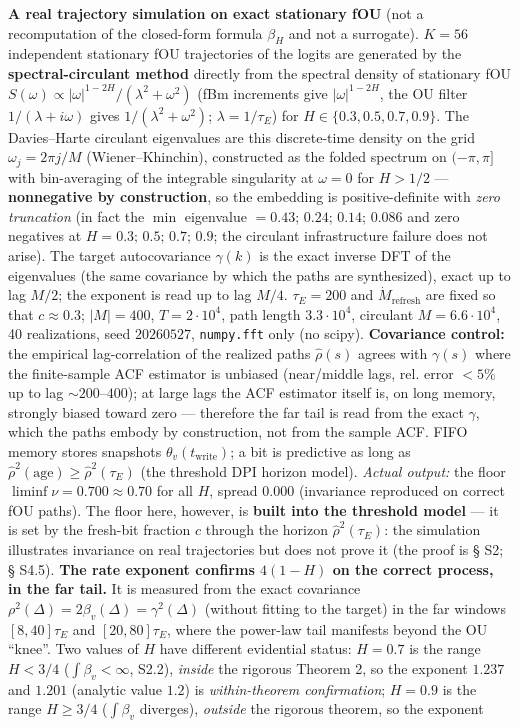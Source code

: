\documentclass[12pt]{iopart}
\begin{document}
\textbf{A real trajectory simulation on exact stationary fOU} (not a recomputation of the closed-form formula \(\beta_H\) and not a surrogate). \(K = 56\) independent stationary fOU trajectories of the logits are generated by the \textbf{spectral-circulant method} directly from the spectral density of stationary fOU \(S(\omega) \propto |\omega|^{1-2H}/(\lambda^2+\omega^2)\) (fBm increments give \(|\omega|^{1-2H}\), the OU filter \(1/(\lambda+i\omega)\) gives \(1/(\lambda^2+\omega^2)\); \(\lambda = 1/\tau_E\)) for \(H \in \{0.3, 0.5, 0.7, 0.9\}\). The Davies--Harte circulant eigenvalues are this discrete-time density on the grid \(\omega_j = 2\pi j/M\) (Wiener--Khinchin), constructed as the folded spectrum on \((-\pi,\pi]\) with bin-averaging of the integrable singularity at \(\omega = 0\) for \(H > 1/2\) --- \textbf{nonnegative by construction}, so the embedding is positive-definite with \emph{zero truncation} (in fact the \(\min\) eigenvalue \(= 0.43;\,0.24;\,0.14;\,0.086\) and zero negatives at \(H = 0.3;\,0.5;\,0.7;\,0.9\); the circulant infrastructure failure does not arise). The target autocovariance \(\gamma(k)\) is the exact inverse DFT of the eigenvalues (the same covariance by which the paths are synthesized), exact up to lag \(M/2\); the exponent is read up to lag \(M/4\). \(\tau_E = 200\) and \(\dot M_{\text{refresh}}\) are fixed so that \(c \approx 0.3\); \(|M| = 400\), \(T = 2\cdot10^4\), path length \(3.3\cdot10^4\), circulant \(M = 6.6\cdot10^4\), 40 realizations, seed \(20260527\), \texttt{numpy.fft} only (no scipy). \textbf{Covariance control:} the empirical lag-correlation of the realized paths \(\hat\rho(s)\) agrees with \(\gamma(s)\) where the finite-sample ACF estimator is unbiased (near/middle lags, rel. error \(<5\%\) up to lag \(\sim200\text{–}400\)); at large lags the ACF estimator itself is, on long memory, strongly biased toward zero --- therefore the far tail is read from the exact \(\gamma\), which the paths embody by construction, not from the sample ACF. FIFO memory stores snapshots \(\theta_v(t_{\text{write}})\); a bit is predictive as long as \(\hat\rho^2(\text{age}) \ge \hat\rho^2(\tau_E)\) (the threshold DPI horizon model). \emph{Actual output:} the floor \(\liminf\nu = 0.700 \approx 0.70\) for all \(H\), spread \(0.000\) (invariance reproduced on correct fOU paths). The floor here, however, is \textbf{built into the threshold model} --- it is set by the fresh-bit fraction \(c\) through the horizon \(\hat\rho^2(\tau_E)\): the simulation illustrates invariance on real trajectories but does not prove it (the proof is § S2; § S4.5). \textbf{The rate exponent confirms \(4(1-H)\) on the correct process, in the far tail.} It is measured from the exact covariance \(\rho^2(\Delta) = 2\beta_v(\Delta) = \gamma^2(\Delta)\) (without fitting to the target) in the far windows \([8,40]\tau_E\) and \([20,80]\tau_E\), where the power-law tail manifests beyond the OU ``knee''. Two values of \(H\) have different evidential status: \(H = 0.7\) is the range \(H < 3/4\) (\(\int\beta_v < \infty\), S2.2), \emph{inside} the rigorous Theorem 2, so the exponent \(1.237\) and \(1.201\) (analytic value \(1.2\)) is \emph{within-theorem confirmation}; \(H = 0.9\) is the range \(H \ge 3/4\) (\(\int\beta_v\) diverges), \emph{outside} the rigorous theorem, so the exponent 
\end{document}
